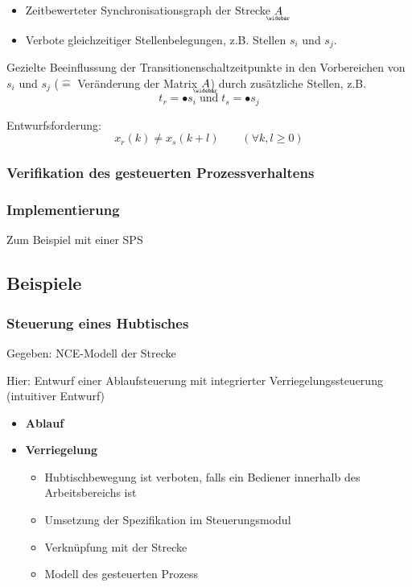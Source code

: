 \begin{enumerate}
	\begin{itemize}
		\item Zeitbewerteter Synchronisationsgraph der Strecke $\wbar{A}$
		\item Verbote gleichzeitiger Stellenbelegungen, z.B. Stellen $s_i$ und $s_j$.
	\end{itemize}
	
	Gezielte Beeinflussung der Transitionenschaltzeitpunkte in den Vorbereichen von $s_i$ und $s_j$ ($\hat{=}$ Veränderung der Matrix $\wbar{A}$) durch zusätzliche Stellen, z.B.
	\begin{equation}
		t_r = \bullet s_i \; \text{und} \; t_s = \bullet s_j
	\end{equation}
	
	Entwurfsforderung:
	\begin{equation}
		x_r(k) \neq x_s(k+l) \qquad (\forall k,l \ge 0)
	\end{equation}
\end{enumerate}

\subsubsection{Verifikation des gesteuerten Prozessverhaltens}

\subsubsection{Implementierung}
Zum Beispiel mit einer SPS 

\subsection{Beispiele}
\subsubsection{Steuerung eines Hubtisches}
Gegeben: NCE-Modell der Strecke 

Hier: Entwurf einer Ablaufsteuerung mit integrierter Verriegelungssteuerung (intuitiver Entwurf)

\begin{itemize}
	\item \textbf{Ablauf}
	\item \textbf{Verriegelung}
	\begin{itemize}
		\item Hubtischbewegung ist verboten, falls ein Bediener innerhalb des Arbeitsbereichs ist
		\item Umsetzung der Spezifikation im Steuerungsmodul
		\item Verknüpfung mit der Strecke 
		\item Modell des gesteuerten Prozess 
	\end{itemize}
\end{itemize}



